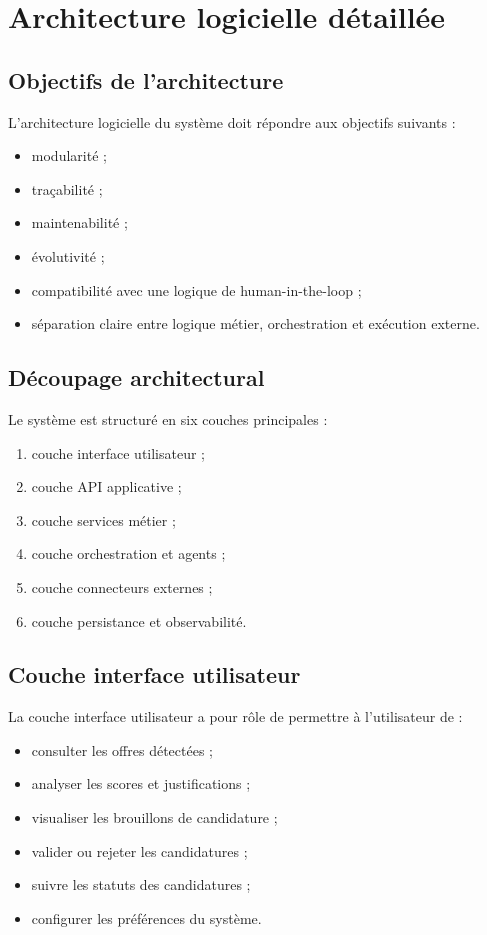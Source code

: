 \documentclass[11pt,a4paper]{article}
\begin{document}
\section{Architecture logicielle détaillée}

\subsection{Objectifs de l’architecture}

L’architecture logicielle du système doit répondre aux objectifs suivants :

\begin{itemize}
    \item modularité ;
    \item traçabilité ;
    \item maintenabilité ;
    \item évolutivité ;
    \item compatibilité avec une logique de human-in-the-loop ;
    \item séparation claire entre logique métier, orchestration et exécution externe.
\end{itemize}

\subsection{Découpage architectural}

Le système est structuré en six couches principales :

\begin{enumerate}
    \item couche interface utilisateur ;
    \item couche API applicative ;
    \item couche services métier ;
    \item couche orchestration et agents ;
    \item couche connecteurs externes ;
    \item couche persistance et observabilité.
\end{enumerate}

\subsection{Couche interface utilisateur}

La couche interface utilisateur a pour rôle de permettre à l’utilisateur de :

\begin{itemize}
    \item consulter les offres détectées ;
    \item analyser les scores et justifications ;
    \item visualiser les brouillons de candidature ;
    \item valider ou rejeter les candidatures ;
    \item suivre les statuts des candidatures ;
    \item configurer les préférences du système.
\end{itemize}
\end{document}
